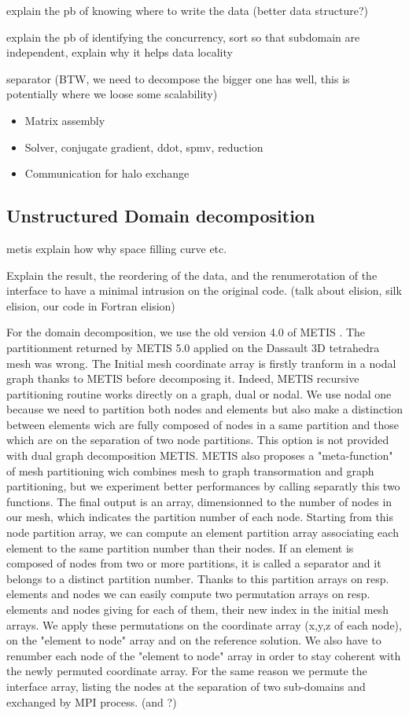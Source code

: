\documentclass{IOS-Book-Article}
\begin{document}
explain the pb of knowing where to write the data (better data structure?)

explain the pb of identifying the concurrency, sort so that subdomain are independent, explain why it helps data locality

separator (BTW, we need to decompose the bigger one has well, this is potentially where we loose some scalability)

\begin{itemize}
\item Matrix assembly
\item Solver, conjugate gradient, ddot, spmv, reduction
\item Communication for halo exchange
\end{itemize}


\subsection{Unstructured Domain decomposition}

metis explain how why space filling curve etc.

Explain the result, the reordering of the data, and the renumerotation of the interface to have a minimal intrusion on the original code.
(talk about elision, silk elision, our code in Fortran elision)

For the domain decomposition, we use the old version 4.0 of METIS . The partitionment returned by METIS 5.0 applied on the Dassault 3D tetrahedra mesh was wrong.
The Initial mesh coordinate array is firstly tranform in a nodal graph thanks to METIS before decomposing it. Indeed, METIS recursive partitioning routine works directly
on a graph, dual or nodal. We use nodal one because we need to partition both nodes and elements but also make a distinction between elements wich are fully composed of
nodes in a same partition and those which are on the separation of two node partitions. This option is not provided with dual graph decomposition METIS.
METIS also proposes a "meta-function" of mesh partitioning wich combines mesh to graph transormation and graph partitioning, but we experiment better performances by
calling separatly this two functions.
The final output is an array, dimensionned to the number of nodes in our mesh, which indicates the partition number of each node.
Starting from this node partition array, we can compute an element partition array associating each element to the same partition number than their nodes.
If an element is composed of nodes from two or more partitions, it is called a separator and it belongs to a distinct partition number.
Thanks to this partition arrays on resp. elements and nodes we can easily compute two permutation arrays on resp. elements and nodes giving for each of them, their new
index in the initial mesh arrays. We apply these permutations on the coordinate array (x,y,z of each node), on the "element to node" array and on the reference solution.
We also have to renumber each node of the "element to node" array in order to stay coherent with the newly permuted coordinate array. For the same reason we permute the
interface array, listing the nodes at the separation of two sub-domains and exchanged by MPI process. (and ?)
\end{document}
